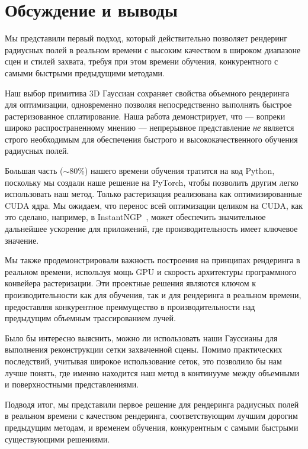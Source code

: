 \section{Обсуждение и выводы}

Мы представили первый подход, который действительно позволяет рендеринг радиусных полей в реальном времени с высоким качеством в широком диапазоне сцен и стилей захвата, требуя при этом времени обучения, конкурентного с самыми быстрыми предыдущими методами.

Наш выбор примитива 3D Гауссиан сохраняет свойства объемного рендеринга для оптимизации, одновременно позволяя непосредственно выполнять быстрое растеризованное сплатирование. Наша работа демонстрирует, что — вопреки широко распространенному мнению — непрерывное представление \emph{не} является строго необходимым для обеспечения быстрого и высококачественного обучения радиусных полей.

Большая часть ($\sim$80\%) нашего времени обучения тратится на код Python, поскольку мы создали наше решение на PyTorch, чтобы позволить другим легко использовать наш метод. Только растеризация реализована как оптимизированные CUDA ядра. Мы ожидаем, что перенос всей оптимизации целиком на CUDA, как это сделано, например, в InstantNGP~\cite{mueller2022instant}, может обеспечить значительное дальнейшее ускорение для приложений, где производительность имеет ключевое значение.

Мы также продемонстрировали важность построения на принципах рендеринга в реальном времени, используя мощь GPU и скорость архитектуры программного конвейера растеризации. Эти проектные решения являются ключом к производительности как для обучения, так и для рендеринга в реальном времени, предоставляя конкурентное преимущество в производительности над предыдущим объемным трассированием лучей.

Было бы интересно выяснить, можно ли использовать наши Гауссианы для выполнения реконструкции сетки захваченной сцены. Помимо практических последствий, учитывая широкое использование сеток, это позволило бы нам лучше понять, где именно находится наш метод в континууме между объемными и поверхностными представлениями.

Подводя итог, мы представили первое решение для рендеринга радиусных полей в реальном времени с качеством рендеринга, соответствующим лучшим дорогим предыдущим методам, и временем обучения, конкурентным с самыми быстрыми существующими решениями.